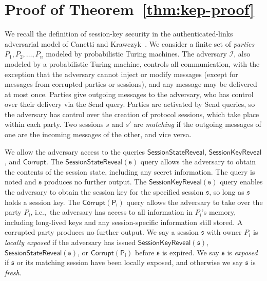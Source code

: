 
\appendix
\section{Proof of Theorem~\ref{thm:kep-proof}}\label{sec:kep-proof}

We recall the definition of session-key security in the
authenticated-links adversarial model of Canetti and
Krawczyk~\cite{canetti}. We consider a finite set of \emph{parties}
$P_1, P_2, \ldots, P_n$ modeled by probabilistic Turing machines.  The
adversary $\mathcal{I}$, also modeled by a probabilistic Turing
machine, controls all communication, with the exception that the
adversary cannot inject or modify messages (except for messages from
corrupted parties or sessions), and any message may be delivered at
most once. Parties give outgoing messages to the adversary, who has
control over their delivery via the \textsf{Send} query. Parties are
activated by \textsf{Send} queries, so the adversary has control over
the creation of protocol sessions, which take place within each party.
Two sessions $s$ and $s'$ are \emph{matching} if the outgoing messages
of one are the incoming messages of the other, and vice versa.

We allow the adversary access to the queries
$\mathsf{SessionStateReveal}$, $\mathsf{SessionKeyReveal}$, and
$\mathsf{Corrupt}$. The $\mathsf{SessionStateReveal}(\mathfrak{s})$
query allows the adversary to obtain the contents of the session
state, including any secret information. The query is noted and
$\mathfrak{s}$ produces no further output.  The
$\mathsf{SessionKeyReveal(\mathfrak{s})}$ query enables the adversary
to obtain the session key for the specified session $\mathfrak{s}$, so
long as $\mathfrak{s}$ holds a session key. The
$\mathsf{Corrupt(P_i)}$ query allows the adversary to take over the
party $P_i$, i.e.,\ the adversary has access to all information in
$P_i$'s memory, including long-lived keys and any session-specific
information still stored. A corrupted party produces no further
output. We say a session $\mathfrak{s}$ with owner $P_i$ is
\emph{locally exposed} if the adversary has issued
$\mathsf{SessionKeyReveal(\mathfrak{s})}$,
$\mathsf{SessionStateReveal(\mathfrak{s})}$, or
$\mathsf{Corrupt(P_i)}$ before $\mathfrak{s}$ is expired. We say
$\mathfrak{s}$ is \emph{exposed} if $\mathfrak{s}$ or its matching
session have been locally exposed, and otherwise we say $\mathfrak{s}$
is \emph{fresh}.

